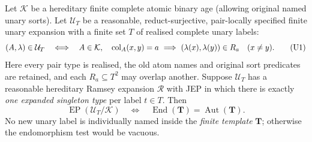 \begin{theorem}
\label{thm:ep-finite-core-criterion}
Let \(\mathcal K\) be a hereditary finite complete
atomic binary age (allowing original named unary sorts).
Let \(\mathcal U_T\) be a reasonable, reduct-surjective,
pair-locally specified finite unary expansion with
a finite set \(T\) of realised complete unary labels:
\[
 (A,\lambda)\in\mathcal U_T
 \quad\Longleftrightarrow\quad
 A\in\mathcal K,\quad
 \operatorname{col}_A(x,y)=a\ \Longrightarrow\
         (\lambda(x),\lambda(y))\in R_a
 \quad(x\ne y).
 \tag{U1}\label{eq:ep-pair-local}
\]
Here every pair type is realised, the old atom
names and original sort predicates are retained,
and each \(R_a\subseteq T^2\) may overlap another.
Suppose \(\mathcal U_T\) has a reasonable hereditary
Ramsey expansion \(\mathcal R\) with JEP in which
there is exactly \emph{one expanded singleton type}
per label \(t\in T\). Then
\[
 \boxed{\quad
 \operatorname{EP}(\mathcal U_T/\mathcal K)
 \quad\Longleftrightarrow\quad
  \operatorname{End}(\mathbf T)
          =\operatorname{Aut}(\mathbf T).
 \quad}
 \tag{U2}\label{eq:ep-core-iff}
\]
No new unary label is individually named inside
the \emph{finite template} \(\mathbf T\); otherwise
the endomorphism test would be vacuous.
\end{theorem}
